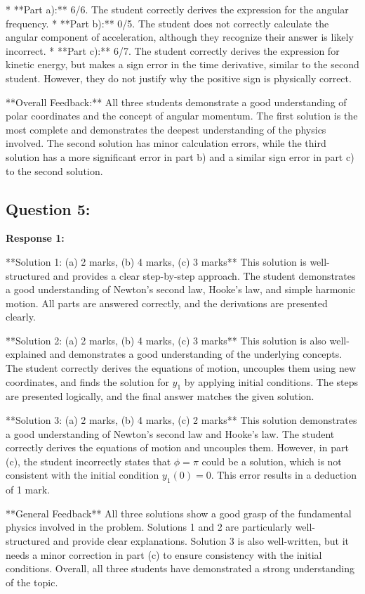 \documentclass[a4paper,11pt]{article}
\begin{document}
*   **Part a):** 6/6. The student correctly derives the expression for the angular frequency.
*   **Part b):** 0/5. The student does not correctly calculate the angular component of acceleration, although they recognize their answer is likely incorrect.
*   **Part c):** 6/7. The student correctly derives the expression for kinetic energy, but makes a sign error in the time derivative, similar to the second student. However, they do not justify why the positive sign is physically correct. 

**Overall Feedback:**
All three students demonstrate a good understanding of polar coordinates and the concept of angular momentum. The first solution is the most complete and demonstrates the deepest understanding of the physics involved. The second solution has minor calculation errors, while the third solution has a more significant error in part b) and a similar sign error in part c) to the second solution. 

\subsection*{Question 5:}

\textbf{Response 1:}

**Solution 1: (a) 2 marks, (b) 4 marks, (c) 3 marks**
This solution is well-structured and provides a clear step-by-step approach. The student demonstrates a good understanding of Newton's second law, Hooke's law, and simple harmonic motion. All parts are answered correctly, and the derivations are presented clearly. 

**Solution 2: (a) 2 marks, (b) 4 marks, (c) 3 marks**
This solution is also well-explained and demonstrates a good understanding of the underlying concepts. The student correctly derives the equations of motion, uncouples them using new coordinates, and finds the solution for \(y_1\) by applying initial conditions. The steps are presented logically, and the final answer matches the given solution.

**Solution 3: (a) 2 marks, (b) 4 marks, (c) 2 marks**
This solution demonstrates a good understanding of Newton's second law and Hooke's law. The student correctly derives the equations of motion and uncouples them. However, in part (c), the student incorrectly states that \( \phi = \pi \) could be a solution, which is not consistent with the initial condition \(y_1(0) = 0\). This error results in a deduction of 1 mark.

**General Feedback**
All three solutions show a good grasp of the fundamental physics involved in the problem. Solutions 1 and 2 are particularly well-structured and provide clear explanations. Solution 3 is also well-written, but it needs a minor correction in part (c) to ensure consistency with the initial conditions. Overall, all three students have demonstrated a strong understanding of the topic.
\end{document}
